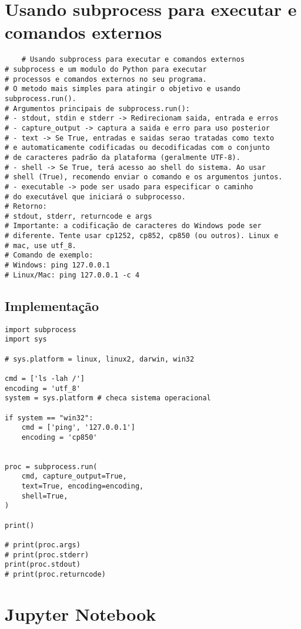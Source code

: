 \documentclass{article}
\begin{document}
\section{
    Usando subprocess para executar e comandos externos}
\begin{lstlisting}
    # Usando subprocess para executar e comandos externos
# subprocess e um modulo do Python para executar
# processos e comandos externos no seu programa.
# O metodo mais simples para atingir o objetivo e usando subprocess.run().
# Argumentos principais de subprocess.run():
# - stdout, stdin e stderr -> Redirecionam saida, entrada e erros
# - capture_output -> captura a saida e erro para uso posterior
# - text -> Se True, entradas e saidas serao tratadas como texto
# e automaticamente codificadas ou decodificadas com o conjunto
# de caracteres padrão da plataforma (geralmente UTF-8).
# - shell -> Se True, terá acesso ao shell do sistema. Ao usar
# shell (True), recomendo enviar o comando e os argumentos juntos.
# - executable -> pode ser usado para especificar o caminho
# do executável que iniciará o subprocesso.
# Retorno:
# stdout, stderr, returncode e args
# Importante: a codificação de caracteres do Windows pode ser
# diferente. Tente usar cp1252, cp852, cp850 (ou outros). Linux e
# mac, use utf_8.
# Comando de exemplo:
# Windows: ping 127.0.0.1
# Linux/Mac: ping 127.0.0.1 -c 4
\end{lstlisting}

\subsection{Implementação}
\begin{lstlisting}
import subprocess
import sys

# sys.platform = linux, linux2, darwin, win32

cmd = ['ls -lah /']
encoding = 'utf_8'
system = sys.platform # checa sistema operacional

if system == "win32":
    cmd = ['ping', '127.0.0.1']
    encoding = 'cp850'


proc = subprocess.run(
    cmd, capture_output=True,
    text=True, encoding=encoding,
    shell=True,
)

print()

# print(proc.args)
# print(proc.stderr)
print(proc.stdout)
# print(proc.returncode)
\end{lstlisting}

\section{Jupyter Notebook }
\end{document}
